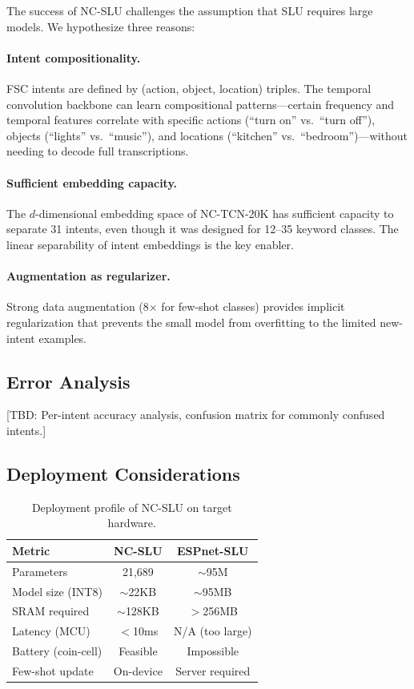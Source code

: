 \documentclass[11pt]{article}
\begin{document}
The success of NC-SLU challenges the assumption that SLU requires large models.
We hypothesize three reasons:

\paragraph{Intent compositionality.}
FSC intents are defined by (action, object, location) triples.
The temporal convolution backbone can learn compositional patterns---certain frequency and temporal features correlate with specific actions (``turn on'' vs.\ ``turn off''), objects (``lights'' vs.\ ``music''), and locations (``kitchen'' vs.\ ``bedroom'')---without needing to decode full transcriptions.

\paragraph{Sufficient embedding capacity.}
The $d$-dimensional embedding space of NC-TCN-20K has sufficient capacity to separate 31 intents, even though it was designed for 12--35 keyword classes.
The linear separability of intent embeddings is the key enabler.

\paragraph{Augmentation as regularizer.}
Strong data augmentation (8$\times$ for few-shot classes) provides implicit regularization that prevents the small model from overfitting to the limited new-intent examples.

\subsection{Error Analysis}

[TBD: Per-intent accuracy analysis, confusion matrix for commonly confused intents.]

\subsection{Deployment Considerations}

\begin{table}[t]
\centering
\small
\caption{Deployment profile of NC-SLU on target hardware.}
\label{tab:deploy}
\begin{tabular}{@{}lcc@{}}
\toprule
\textbf{Metric} & \textbf{NC-SLU} & \textbf{ESPnet-SLU} \\
\midrule
Parameters       & 21,689    & $\sim$95M \\
Model size (INT8)& $\sim$22KB  & $\sim$95MB \\
SRAM required    & $\sim$128KB & $>$256MB \\
Latency (MCU)    & $<$10ms   & N/A (too large) \\
Battery (coin-cell) & Feasible & Impossible \\
Few-shot update  & On-device & Server required \\
\bottomrule
\end{tabular}
\end{table}
\end{document}
